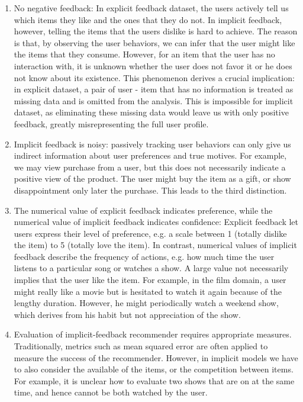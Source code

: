 \begin{enumerate}
	\item No negative feedback: In explicit feedback dataset, the users actively tell us which items they like and the ones that they do not. In implicit feedback, however, telling the items that the users dislike is hard to achieve. The reason is that, by observing the user behaviors, we can infer that the user might like the items that they consume. However, for an item that the user has no interaction with, it is unknown whether the user does not favor it or he does not know about its existence. This phenomenon derives a crucial implication: in explicit dataset, a pair of user - item that has no information is treated as missing data and is omitted from the analysis. This is impossible for implicit dataset, as eliminating these missing data would leave us with only positive feedback, greatly misrepresenting the full user profile. 
	
	\item Implicit feedback is noisy: passively tracking user behaviors can only give us indirect information about user preferences and true motives. For example, we may view purchase from a user, but this does not necessarily indicate a positive view of the product. The user might buy the item as a gift, or show disappointment only later the purchase. This leads to the third distinction.
	
	\item The numerical value of explicit feedback indicates preference, while the numerical value of implicit feedback indicates confidence: Explicit feedback let users express their level of preference, e.g. a scale between 1 (totally dislike the item) to 5 (totally love the item). In contrast, numerical values of implicit feedback describe the frequency of actions, e.g. how much time the user listens to a particular song or watches a show. A large value not necessarily implies that the user like the item. For example, in the film domain, a user might really like a movie but is hesitated to watch it again because of the lengthy duration. However, he might periodically watch a weekend show, which derives from his habit but not appreciation of the show. 
	
	\item Evaluation of implicit-feedback recommender requires appropriate measures. Traditionally, metrics such as mean squared error are often applied to measure the success of the recommender. However, in implicit models we have to also consider the available of the items, or the competition between items. For example, it is unclear how to evaluate two shows that are on at the same time, and hence cannot be both watched by the user.
\end{enumerate}

